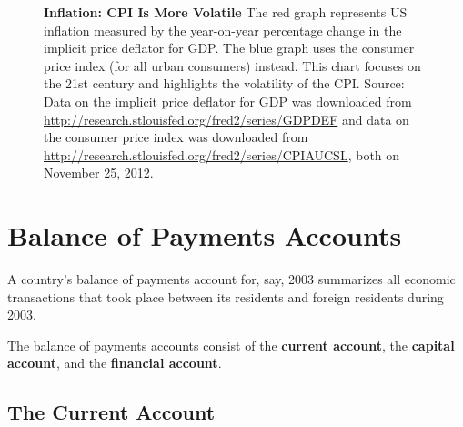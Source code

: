 \documentclass[
  letterpaper,
]{book}
\begin{document}
\begin{figure}


\caption{\label{fig-cpi-volatile}\textbf{Inflation: CPI Is More
Volatile} The red graph represents US inflation measured by the
year-on-year percentage change in the implicit price deflator for GDP.
The blue graph uses the consumer price index (for all urban consumers)
instead. This chart focuses on the 21st century and highlights the
volatility of the CPI. Source: Data on the implicit price deflator for
GDP was downloaded from
\url{http://research.stlouisfed.org/fred2/series/GDPDEF} and data on the
consumer price index was downloaded from
\url{http://research.stlouisfed.org/fred2/series/CPIAUCSL}, both on
November 25, 2012.}

\end{figure}%


\chapter{Balance of Payments Accounts}\label{sec-bopacc}

A country's balance of payments account for,
say, 2003 summarizes all economic transactions that took place between
its residents and foreign residents during 2003.

The balance of payments accounts consist of the \textbf{current
account}, the \textbf{capital account}, and the \textbf{financial
account}.

\section{The Current Account}\label{sec-curacc}
\end{document}
